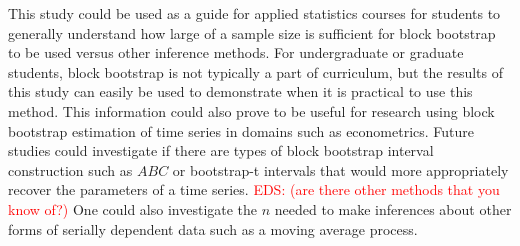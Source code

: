 \documentclass[12pt, letterpaper, titlepage]{article}
\newcommand{\eds}[1]{\textcolor{red}{EDS: (#1)}}
\begin{document}
This study could be used as a guide for applied statistics courses for students
to generally understand how large of a sample size is sufficient for block
bootstrap to be used versus other inference methods. For undergraduate or
graduate students, block bootstrap is not typically a part of curriculum, but the 
results of this study can easily be used to demonstrate when it is practical to use 
this method.
This information could also prove to be useful for research using block
bootstrap
estimation of time series in domains such as econometrics. Future studies
could investigate if there are types of block bootstrap interval
construction such as $ABC$ or bootstrap-t intervals
that would more appropriately recover the parameters of a time
series. \eds{are there other methods that you know of?} 
One could also investigate the $n$ needed to make inferences about
other forms of serially dependent data such as a moving average process. 



\end{document}
